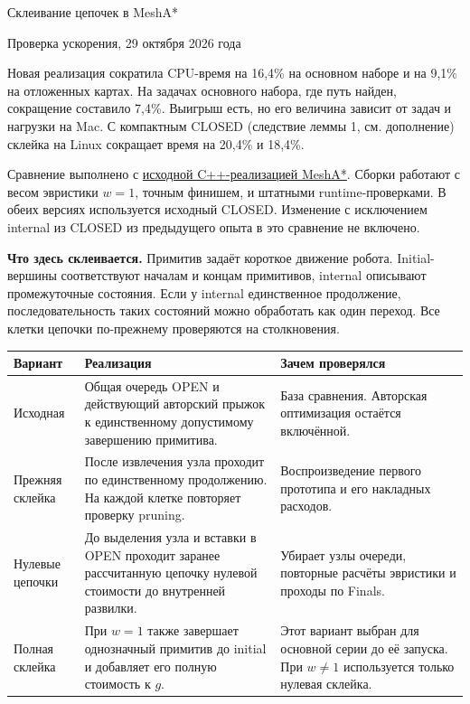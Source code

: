 \documentclass[11pt,a4paper]{article}
\newcommand{\code}[1]{\texttt{\detokenize{#1}}}
\begin{document}
{\LARGE Склеивание цепочек в MeshA*}\par
{\small Проверка ускорения, 29 октября 2026 года}

Новая реализация сократила CPU-время на 16,4\% на основном наборе и на 9,1\% на отложенных картах. На задачах основного набора, где путь найден, сокращение составило 7,4\%. Выигрыш есть, но его величина зависит от задач и нагрузки на Mac. С компактным CLOSED (следствие леммы 1, см. дополнение) склейка на Linux сокращает время на 20,4\% и 18,4\%.

Сравнение выполнено с \href{https://github.com/PathPlanning/MeshAStar}{исходной C++-реализацией MeshA*}. Сборки работают с весом эвристики \(w=1\), точным финишем, \code{C++17 -O3} и штатными runtime-проверками. В обеих версиях используется исходный CLOSED. Изменение с исключением internal из CLOSED из предыдущего опыта в это сравнение не включено.

\textbf{Что здесь склеивается.} Примитив задаёт короткое движение робота. Initial-вершины соответствуют началам и концам примитивов, internal описывают промежуточные состояния. Если у internal единственное продолжение, последовательность таких состояний можно обработать как один переход. Все клетки цепочки по-прежнему проверяются на столкновения.

{\small
\begin{tabular}{@{}L{28mm}L{75mm}L{59mm}@{}}
\toprule
Вариант & Реализация & Зачем проверялся \\
\midrule
Исходная & Общая очередь OPEN и действующий авторский прыжок к единственному допустимому завершению примитива. & База сравнения. Авторская оптимизация остаётся включённой. \\
\addlinespace[5pt]
Прежняя склейка & После извлечения узла проходит по единственному продолжению. На каждой клетке повторяет проверку pruning. & Воспроизведение первого прототипа и его накладных расходов. \\
\addlinespace[5pt]
Нулевые цепочки & До выделения узла и вставки в OPEN проходит заранее рассчитанную цепочку нулевой стоимости до внутренней развилки. & Убирает узлы очереди, повторные расчёты эвристики и проходы по Finals. \\
\addlinespace[5pt]
Полная склейка & При \(w=1\) также завершает однозначный примитив до initial и добавляет его полную стоимость к \(g\). & Этот вариант выбран для основной серии до её запуска. При \(w\ne1\) используется только нулевая склейка. \\
\bottomrule
\end{tabular}}
\end{document}
